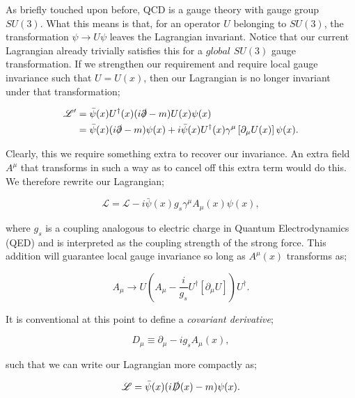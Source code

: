 As briefly touched upon before, QCD is a gauge theory with gauge group $SU(3)$. What this means is that, for an operator $U$ belonging to $SU(3)$, the transformation $\psi \to U\psi$ leaves the Lagrangian invariant. Notice that our current Lagrangian already trivially satisfies this for a $global$ $SU(3)$ gauge transformation. If we strengthen our requirement and require local gauge invariance such that $U = U(x)$, then our Lagrangian is no longer invariant under that transformation;

\begin{equation}
\begin{split}
\mathscr{L}'& = \bar{\psi}(x)U^\dagger(x)(i \slashed{\partial} - m) U(x)\psi(x)\\
& = \bar{\psi}(x)(i \slashed{\partial} - m)\psi(x) + i \bar{\psi}(x) U^\dagger(x)\gamma^\mu\left[\partial_\mu U(x) \right]\psi(x).
\end{split}
\end{equation}

Clearly, this we require something extra to recover our invariance. An extra field $A^\mu$ that transforms in such a way as to cancel off this extra term would do this. We therefore rewrite our Lagrangian;

\begin{equation}
\mathscr{L} = \mathscr{L} - i \bar{\psi} (x) g_s \gamma^\mu A_\mu(x) \psi(x),
\end{equation} 

where $g_s$ is a coupling analogous to electric charge in Quantum Electrodynamics (QED) and is interpreted as the coupling strength of the strong force. This addition will guarantee local gauge invariance so long as $A^\mu(x)$ transforms as;

\begin{equation}
A_\mu \to U \left(A_\mu - \frac{i}{g_s} U^\dagger \left[\partial_\mu U \right] \right)U^\dagger.
\label{agaugetrans}
\end{equation}

It is conventional at this point to define a \emph{covariant derivative};

\begin{equation}
D_\mu \equiv \partial_\mu - i g_s A_\mu(x),
\end{equation}

such that we can write our Lagrangian more compactly as;

\begin{equation}
\mathscr{L} = \bar{\psi}(x)(i \slashed{D}(x) - m) \psi(x).
\end{equation}

